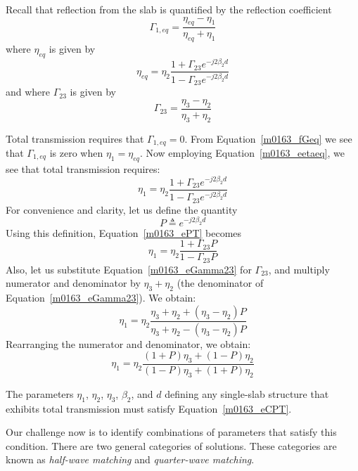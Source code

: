 Recall that reflection from the slab is quantified by the reflection coefficient
%
\begin{equation}
\Gamma_{1,eq} = \frac{\eta_{eq}-\eta_1}{\eta_{eq}+\eta_1} 
\label{m0163_fGeq}
\end{equation}
%
where $\eta_{eq}$ is given by
%
\begin{equation}
\eta_{eq} = \eta_2 \frac{ 1 + \Gamma_{23} e^{-j2\beta_2 d} }{ 1 - \Gamma_{23} e^{-j2\beta_2 d} } 
\label{m0163_eetaeq}
\end{equation}
%
and where $\Gamma_{23}$ is given by
%
\begin{equation}
\Gamma_{23} = \frac{\eta_3-\eta_2}{\eta_3+\eta_2}
\label{m0163_eGamma23}
\end{equation}

Total transmission requires that $\Gamma_{1,eq}=0$.
From Equation~\ref{m0163_fGeq} we see that $\Gamma_{1,eq}$ is zero when $\eta_1=\eta_{eq}$.
Now employing Equation~\ref{m0163_eetaeq}, we see that total transmission requires:
%
\begin{equation}
\eta_{1} = \eta_2 \frac{ 1 + \Gamma_{23} e^{-j2\beta_2 d} }{ 1 - \Gamma_{23} e^{-j2\beta_2 d} } 
\label{m0163_ePT}
\end{equation}
%
For convenience and clarity, let us define the quantity
%
\begin{equation}
P \triangleq e^{-j2\beta_2 d}
\label{m0163_ePdef}
\end{equation}
%
Using this definition, Equation~\ref{m0163_ePT} becomes
%
\begin{equation}
\eta_{1}  = \eta_2 \frac{ 1 + \Gamma_{23} P }{ 1 - \Gamma_{23} P }
\label{m0163_ePT2}
\end{equation}
%
Also, let us substitute Equation~\ref{m0163_eGamma23} for $\Gamma_{23}$, and multiply numerator and denominator by $\eta_3+\eta_2$ (the denominator of Equation~\ref{m0163_eGamma23}). We obtain: 
%
\begin{equation}
\eta_{1}  = \eta_2 \frac{ \eta_3 + \eta_2 + (\eta_3 - \eta_2)P }{ \eta_3 + \eta_2 - (\eta_3 - \eta_2)P  }
\end{equation}
%
Rearranging the numerator and denominator, we obtain:
%
\begin{equation}
\boxed{
\eta_{1}  
= \eta_2 \frac{ (1+P)\eta_3 + (1-P)\eta_2 }{ (1-P)\eta_3 + (1+P)\eta_2  }
}
\label{m0163_eCPT}
\end{equation}
%
\begin{mdframed}[backgroundcolor=yellow!20,nobreak=true] 
The parameters $\eta_1$, $\eta_2$, $\eta_3$, $\beta_2$, and $d$ defining any single-slab structure that exhibits total transmission must satisfy Equation~\ref{m0163_eCPT}.
\end{mdframed}
%
Our challenge now is to identify combinations of parameters that satisfy this condition. 
There are two general categories of solutions. 
These categories are known as {\it half-wave matching} and {\it quarter-wave matching}.

